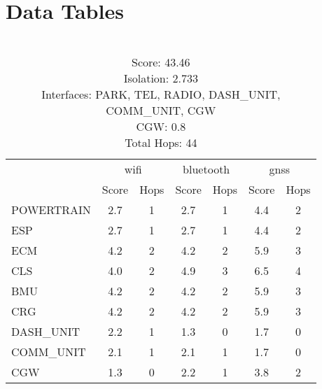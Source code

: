 \chapter{Data Tables}
\label{apx:datatables}

\begin{table}[ht]
    \centering
    \caption{ \\ Score: 43.46 \\ Isolation: 2.733 \\ Interfaces: PARK, TEL, RADIO, DASH\_UNIT, COMM\_UNIT, CGW \\ CGW: 0.8 \\ Total Hops: 44}
    \label{tab:arch1}
    \begin{tabular}{lcccccc}
    \hline
     & \multicolumn{2}{c}{wifi} & \multicolumn{2}{c}{bluetooth} & \multicolumn{2}{c}{gnss} \\
     & Score & Hops & Score & Hops & Score & Hops \\
    \hline
    POWERTRAIN & 2.7 & 1 & 2.7 & 1 & 4.4 & 2 \\
    ESP & 2.7 & 1 & 2.7 & 1 & 4.4 & 2 \\
    ECM & 4.2 & 2 & 4.2 & 2 & 5.9 & 3 \\
    CLS & 4.0 & 2 & 4.9 & 3 & 6.5 & 4 \\
    BMU & 4.2 & 2 & 4.2 & 2 & 5.9 & 3 \\
    CRG & 4.2 & 2 & 4.2 & 2 & 5.9 & 3 \\
    DASH\_UNIT & 2.2 & 1 & 1.3 & 0 & 1.7 & 0 \\
    COMM\_UNIT & 2.1 & 1 & 2.1 & 1 & 1.7 & 0 \\
    CGW & 1.3 & 0 & 2.2 & 1 & 3.8 & 2 \\
    \hline
    \end{tabular}
\end{table}
    

